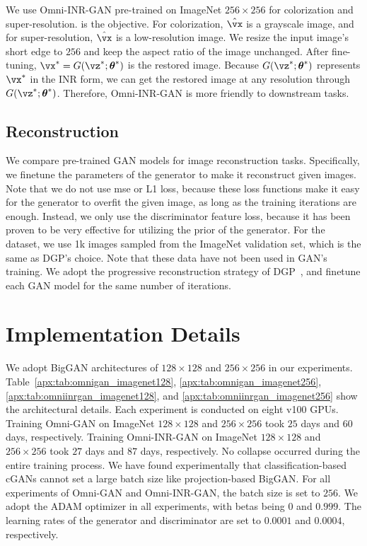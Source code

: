 \documentclass[paper_2425.tex]{subfiles}
\begin{document}
We use Omni-INR-GAN pre-trained on ImageNet $256\times256$ for colorization and super-resolution.  is the objective. For colorization, $\hat{\vx}$ is a grayscale image, and for super-resolution, $\hat{\vx}$ is a low-resolution image. We resize the input image's short edge to $256$ and keep the aspect ratio of the image unchanged.  After fine-tuning, $\vx^{*}=G(\vz^{*} ; \boldsymbol{\theta}^{*})$ is the restored image. Because $G(\vz^{*}; \boldsymbol{\theta}^{*})$ represents $\vx^{*}$ in the INR form, we can get the restored image at any resolution through $G(\vz^{*}; \boldsymbol{\theta}^{*})$. Therefore, Omni-INR-GAN is more friendly to downstream tasks.



\subsection{Reconstruction}

We compare pre-trained GAN models for image reconstruction tasks. Specifically, we finetune the parameters of the generator to make it reconstruct given images. Note that we do not use mse or L1 loss, because these loss functions make it easy for the generator to overfit the given image, as long as the training iterations are enough. Instead, we only use the discriminator feature loss, because it has been proven to be very effective for utilizing the prior of the generator. For the dataset, we use 1k images sampled from the ImageNet validation set, which is the same as DGP's choice. Note that these data have not been used in GAN's training. We adopt the progressive reconstruction strategy of DGP~\cite{pan2020Exploiting}, and finetune each GAN model for the same number of iterations.


\section{Implementation Details}

We adopt BigGAN architectures of $128\times128$ and $256\times256$ in our experiments. Table~\ref{apx:tab:omnigan_imagenet128}, \ref{apx:tab:omnigan_imagenet256}, \ref{apx:tab:omniinrgan_imagenet128}, and \ref{apx:tab:omniinrgan_imagenet256} show the architectural details. Each experiment is conducted on eight v100 GPUs. Training Omni-GAN on ImageNet $128\times128$ and $256\times256$ took $25$ days and $60$ days, respectively. Training Omni-INR-GAN on ImageNet $128\times128$ and $256\times256$ took $27$ days and $87$ days, respectively. No collapse occurred during the entire training process. We have found experimentally that classification-based cGANs cannot set a large batch size like projection-based BigGAN. For all experiments of Omni-GAN and Omni-INR-GAN, the batch size is set to $256$. We adopt the ADAM optimizer in all experiments, with betas being $0$ and $0.999$. The learning rates of the generator and discriminator are set to $0.0001$ and $0.0004$, respectively.
\end{document}
